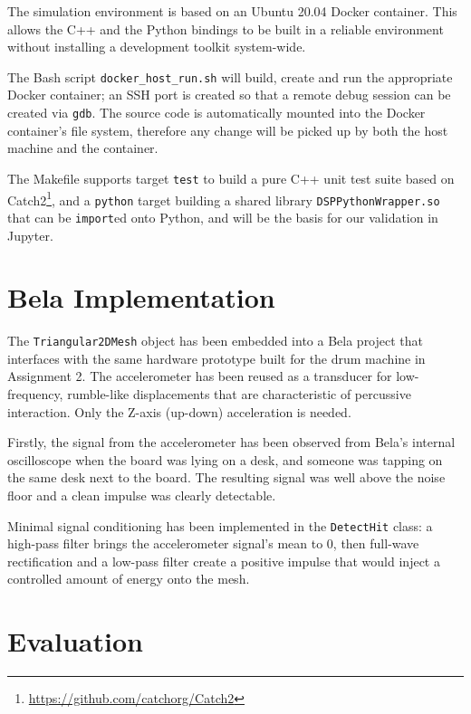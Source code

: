 \documentclass{article}
\begin{document}
The simulation environment is based on an Ubuntu 20.04
Docker container. This allows the C++ and the Python bindings
to be built in a reliable environment without installing
a development toolkit system-wide.

The Bash script \texttt{docker\_host\_run.sh} will build, create
and run the appropriate Docker container; an SSH port is created
so that a remote debug session can be created via \texttt{gdb}.
The source code is automatically mounted into the Docker container's
file system, therefore any change will be picked up by both the
host machine and the container.

The Makefile supports target \texttt{test} to build a pure C++
unit test suite based on
Catch2\footnote{\url{https://github.com/catchorg/Catch2}},
and a \texttt{python} target building a shared library
\texttt{DSPPythonWrapper.so} that can be \texttt{import}ed
onto Python, and will be the basis for our validation in
Jupyter.


\section{Bela Implementation}

The \texttt{Triangular2DMesh} object has been embedded into
a Bela project that interfaces with the same hardware prototype
built for the drum machine in Assignment 2. The accelerometer
has been reused as a transducer for low-frequency, rumble-like
displacements that are characteristic of percussive interaction.
Only the Z-axis (up-down) acceleration is needed.

Firstly, the signal from the accelerometer has been observed
from Bela's internal oscilloscope when the board was lying
on a desk, and someone was tapping on the same desk next
to the board. The resulting signal was well above the noise
floor and a clean impulse was clearly detectable.

Minimal signal conditioning has been implemented
in the \texttt{DetectHit} class: a high-pass
filter brings the accelerometer signal's mean to 0, then full-wave rectification
and a low-pass filter create a positive impulse that would inject
a controlled amount of energy onto the mesh.

\section{Evaluation}
\end{document}
